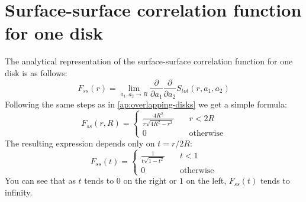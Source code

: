 \documentclass[reprint,amsmath,amssymb,aps,pre]{revtex4-1}
\begin{document}
\section{Surface-surface correlation function for one disk}
The analytical representation of the surface-surface correlation function for
one disk is as follows:
\begin{equation*}
  F_{ss}(r) = \lim_{a_1, a_2 \rightarrow R} \frac{\partial}{\partial a_1}
  \frac{\partial}{\partial a_2} S_{tot}(r, a_1, a_2)
\end{equation*}
Following the same steps as in \cref{ap:overlapping-disks} we get a simple
formula:
\begin{equation*}
  F_{ss}(r,R) = \left\{
  \begin{array}{ll}
    \frac{4R^2}{r\sqrt{4R^2-r^2}} & \quad r < 2R \\
    0 & \quad \text{otherwise}
  \end{array} \right.
\end{equation*}
The resulting expression depends only on $t = r / 2R$:
\begin{equation*}
  F_{ss}(t) = \left\{
  \begin{array}{ll}
    \frac{1}{t\sqrt{1-t^2}} & \quad t < 1 \\
    0 & \quad \text{otherwise}
  \end{array} \right.
\end{equation*}
You can see that as $t$ tends to $0$ on the right or $1$ on the left,
$F_{ss}(t)$ tends to infinity.

\onecolumngrid


\twocolumngrid
\end{document}
